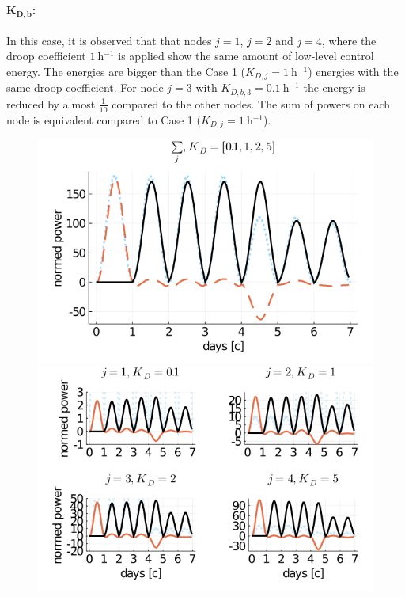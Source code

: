 \paragraph{$\boldsymbol{K_{D,b}}$:}
In this case, it is observed that that nodes $j=1$, $j=2$ and $j=4$, where the droop coefficient $\SI{1}{\hour^{-1}}$ is applied show the same amount of low-level control energy. The energies are bigger than the Case 1 ($K_{D,j} = \SI{1}{\hour^{-1}}$) energies with the same droop coefficient. For node $j=3$ with $K_{D,b,3} = \SI{0.1}{\hour^{-1}}$ the energy is reduced by almost $\frac{1}{10}$ compared to the other nodes. The sum of powers on each node is equivalent compared to Case 1 ($K_{D,j} = \SI{1}{\hour^{-1}}$). 
\begin{figure}[h]
	\centering
	\includegraphics[scale=0.55]{pictures/plots/manual_calc_variation_kappa/kappa_1/K_variance/KDa/DC_prosumer_demand_seconds_sum_hetero.png}

	\bigbreak
	\includegraphics[scale=0.55]{pictures/plots/manual_calc_variation_kappa/kappa_1/K_variance/KDa/DC_prosumer_demand_seconds_nodes_hetero.png}




\end{figure}
